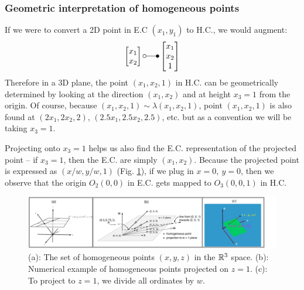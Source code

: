 \documentclass[a4paper]{article}
\begin{document}
\subsubsection{Geometric interpretation of homogeneous points}

If we were to convert a 2D point in E.C $(x_1, y_1)$ to H.C., we would augment:
\[
\begin{bmatrix}
x_1 \\ x_2    
\end{bmatrix}
\laplace
\begin{bmatrix}
x_1 \\ x_2  \\ 1
\end{bmatrix}
\]
Therefore in a 3D plane, the point $(x_1,x_2,1)$ in H.C. can be geometrically determined by looking at the direction $(x_1, x_2)$ and at height $x_3=1$ from the origin. Of course, because $(x_1,x_2,1) \sim \lambda(x_1,x_2,1)$, point $(x_1,x_2,1)$ is also found at $(2x_1,2x_2,2)$, $(2.5x_1,2.5x_2,2.5)$, etc. but as a convention we will be taking $x_3=1$.

Projecting onto $x_3 = 1$ helps us also find the E.C. representation of the projected point -- if $x_3=1$, then the E.C. are simply $(x_1, x_2)$. Because the projected point is expressed as $(x/w, y/w, 1)$ (Fig. \ref{fig:hc_vis_in_R3}), if we plug in $x=0,\ y=0$, then we observe that the origin $O_2(0,0)$ in E.C. gets mapped to $O_3(0,0,1)$ in H.C.
\begin{figure}[H]
    \centering
    \includegraphics[width=1.08\linewidth]{img/hom_point_vis.png}
    \caption{(a): The set of homogeneous points $(x,y,z)$ in the $\mathbb{R}^3$ space. (b): Numerical example of homogeneous points projected on $z=1$. (c): To project to $z=1$, we divide all ordinates by $w$.}
    \label{fig:hc_vis_in_R3}
\end{figure}


\end{document}
